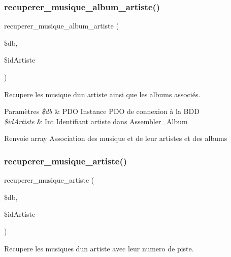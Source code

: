 \subsubsection{\texorpdfstring{recuperer\+\_\+musique\+\_\+album\+\_\+artiste()}{recuperer\_musique\_album\_artiste()}}
{\footnotesize\ttfamily recuperer\+\_\+musique\+\_\+album\+\_\+artiste (\begin{DoxyParamCaption}\item[{}]{\$db,  }\item[{}]{\$id\+Artiste }\end{DoxyParamCaption})}



Recupere les musique d\textquotesingle{}un artiste ainsi que les albums associés. 


\begin{DoxyParams}{Paramètres}
{\em \$db} & P\+DO Instance P\+DO de connexion à la B\+DD \\
\hline
{\em \$id\+Artiste} & Int Identifiant artiste dans Assembler\+\_\+\+Album \\
\hline
\end{DoxyParams}
\begin{DoxyReturn}{Renvoie}
array Association des musique et de leur artistes et des albums 
\end{DoxyReturn}
\mbox{\label{fonctionArtiste_8php_a2b95a99d7c2dc74bec32f693024e103f}} 
\subsubsection{\texorpdfstring{recuperer\+\_\+musique\+\_\+artiste()}{recuperer\_musique\_artiste()}}
{\footnotesize\ttfamily recuperer\+\_\+musique\+\_\+artiste (\begin{DoxyParamCaption}\item[{}]{\$db,  }\item[{}]{\$id\+Artiste }\end{DoxyParamCaption})}



Recupere les musiques d\textquotesingle{}un artiste avec leur numero de piste. 



